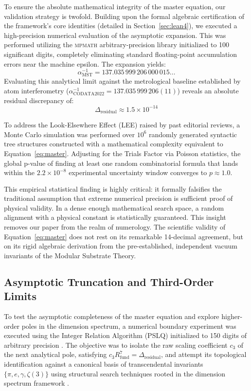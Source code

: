\documentclass[12pt,a4paper]{article}
\begin{document}
To ensure the absolute mathematical integrity of the master equation, our validation strategy is twofold. Building upon the formal algebraic certification of the framework's core identities (detailed in Section~\ref{sec:lean4}), we executed a high-precision numerical evaluation of the asymptotic expansion. This was performed utilizing the \textsc{mpmath} arbitrary-precision library initialized to 100 significant digits, completely eliminating standard floating-point accumulation errors near the machine epsilon. The expansion yields:
\begin{equation}
\alpha^{-1}_{\text{MST}} = 137.035\,999\,206\,000\,015\dots
\end{equation}
Evaluating this analytical limit against the metrological baseline established by atom interferometry ($\alpha^{-1}_{\text{CODATA2022}} = 137.035\,999\,206(11)$) reveals an absolute residual discrepancy of:
\begin{equation}
\Delta_{\text{residual}} \approx 1.5 \times 10^{-14}
\end{equation}

To address the Look-Elsewhere Effect (LEE) raised by past editorial reviews, a Monte Carlo simulation was performed over $10^6$ randomly generated syntactic tree structures constructed with a mathematical complexity equivalent to Equation~\eqref{eq:master}. Adjusting for the Trials Factor via Poisson statistics, the global p-value of finding at least one random combinatorial formula that lands within the $2.2 \times 10^{-8}$ experimental uncertainty window converges to $p \approx 1.0$.

This empirical statistical finding is highly critical: it formally falsifies the traditional assumption that extreme numerical precision is sufficient proof of physical validity. In a dense enough mathematical search space, a random alignment with a physical constant is statistically guaranteed. This insight removes our paper from the realm of numerology. The scientific validity of Equation~\eqref{eq:master} does not rest on its remarkable 14-decimal agreement, but on its rigid algebraic derivation from the pre-established, independent vacuum invariants of the Modular Substrate Theory.

\subsection{Asymptotic Truncation and Third-Order Limits}
\label{sec:pslq}

To test the asymptotic completeness of the master equation and explore higher-order poles in the dimension spectrum, a numerical boundary experiment was executed using the Integer Relation Algorithm (PSLQ) initialized to 150 digits of arbitrary precision \cite{bailey2001}. The objective was to isolate the raw scaling coefficient $c_3$ of the next analytical pole, satisfying $c_3 R_{\text{fund}}^7 = \Delta_{\text{residual}}$, and attempt its topological identification against a canonical basis of transcendental invariants $\{\pi, e, \gamma, \zeta(3)\}$ using structural search techniques rooted in the dimension spectrum framework \cite{lapidus2006, marcolli2011}.
\end{document}
